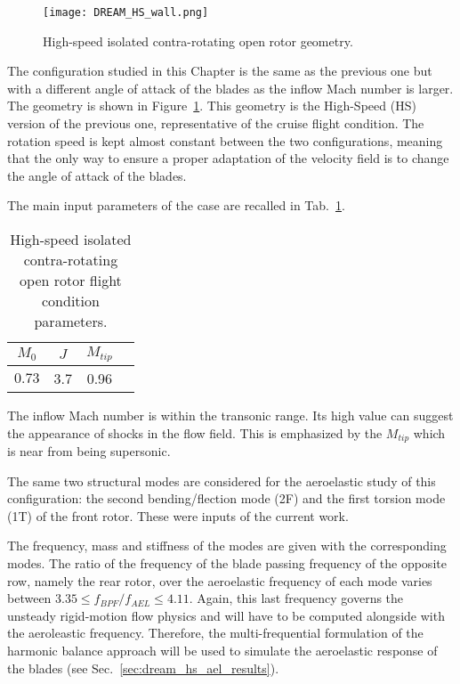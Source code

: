 
\begin{figure}[htp]
  \centering
  \texttt{[image: DREAM\_HS\_wall.png]}
  \caption{High-speed isolated contra-rotating open rotor geometry.}
  \label{fig:dream_hs_wall}
\end{figure}

The configuration studied in this Chapter is the same as the
previous one but with a different angle of attack of
the blades as the inflow Mach number is larger. 
The geometry is shown in Figure~\ref{fig:dream_hs_wall}.
This geometry is the High-Speed (HS) version of the previous one, 
representative of the cruise flight condition. The rotation speed is kept
almost constant between the two configurations, meaning that
the only way to ensure
a proper adaptation of the velocity field is to change the angle of 
attack of the blades.

The main input parameters of the case are recalled in
Tab.~\ref{tab:dream_hs_flight_condition}.
\begin{table}[htp]
   \centering
  \begin{tabular}{cccc}
    \toprule
    $M_0$ & $J$ & $M_{tip}$ \\
    \midrule
    $0.73$ & 3.7 & 0.96  \\
    \bottomrule
  \end{tabular}
  \caption{High-speed isolated contra-rotating open rotor flight condition parameters.}
  \label{tab:dream_hs_flight_condition}
\end{table} 
The inflow Mach number is within the transonic range. Its high value
can suggest the appearance of shocks in the flow field. 
This is emphasized by the $M_{tip}$ which is
near from being supersonic.

The same two structural modes are considered for the aeroelastic study of this 
configuration: the second bending/flection mode (2F) and the first torsion mode (1T)
of the front rotor. These were inputs of the current work.

The frequency, mass and stiffness of the modes 
are given with the corresponding modes.
The ratio of the frequency of the blade passing 
frequency of the opposite row, namely the rear rotor,
over the aeroelastic frequency of
each mode varies between 
$3.35 \leq f_{BPF} / f_{AEL} \leq 4.11$. Again,
this last frequency governs the unsteady rigid-motion flow physics 
and will have to be computed alongside with the aeroleastic frequency.
Therefore, the multi-frequential formulation of the
harmonic balance approach will be used to simulate the
aeroelastic response of the blades (see Sec.~\ref{sec:dream_hs_ael_results}).

